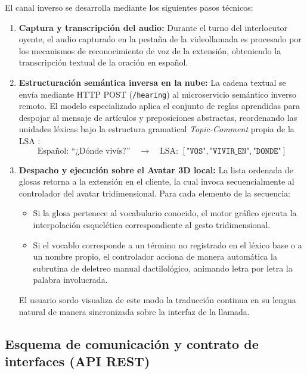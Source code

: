 El canal inverso se desarrolla mediante los siguientes pasos técnicos:
\begin{enumerate}
    \item \textbf{Captura y transcripción del audio:} Durante el turno del interlocutor oyente, el audio capturado en la pestaña de la videollamada es procesado por los mecanismos de reconocimiento de voz de la extensión, obteniendo la transcripción textual de la oración en español.
    \item \textbf{Estructuración semántica inversa en la nube:} La cadena textual se envía mediante HTTP POST (\texttt{/hearing}) al microservicio semántico inverso remoto. El modelo especializado aplica el conjunto de reglas aprendidas para despojar al mensaje de artículos y preposiciones abstractas, reordenando las unidades léxicas bajo la estructura gramatical \textit{Topic-Comment} propia de la LSA \parencite{massone2012curso}:
    \begin{equation}
        \text{Español: ``¿Dónde vivís?''} \quad \longrightarrow \quad \text{LSA: } [\texttt{"VOS"}, \texttt{"VIVIR\_EN"}, \texttt{"DONDE"}]
    \end{equation}
    \item \textbf{Despacho y ejecución sobre el Avatar 3D local:} La lista ordenada de glosas retorna a la extensión en el cliente, la cual invoca secuencialmente al controlador del avatar tridimensional. Para cada elemento de la secuencia:
    \begin{itemize}
        \item Si la glosa pertenece al vocabulario conocido, el motor gráfico ejecuta la interpolación esquelética correspondiente al gesto tridimensional.
        \item Si el vocablo corresponde a un término no registrado en el léxico base o a un nombre propio, el controlador acciona de manera automática la subrutina de deletreo manual dactilológico, animando letra por letra la palabra involucrada.
    \end{itemize}
    El usuario sordo visualiza de este modo la traducción continua en su lengua natural de manera sincronizada sobre la interfaz de la llamada.
\end{enumerate}

\subsection{Esquema de comunicación y contrato de interfaces (API REST)}

